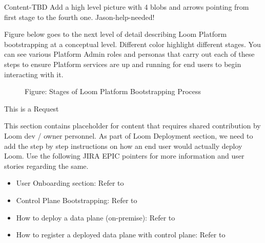 \documentclass[letterpaper,10pt,english]{sphinxmanual}
\begin{document}
\begin{itemize}
\end{itemize}

Content-TBD
Add a high level picture with 4 blobs and arrows pointing from first stage to the fourth one.
Jason-help-needed!

Figure below goes to the next level of detail describing Loom Platform bootstrapping at a conceptual level.  Different color highlight different stages.  You can see various Platform Admin roles and personas that carry out each of these steps to ensure Platform services are up and running for end users to begin interacting with it.

\begin{figure}[htbp]
\centering
\capstart

\noindent{}
\caption{Figure: Stages of Loom Platform Bootstrapping Process}\label{\detokenize{loom_installation_guide:id2}}\end{figure}




This is a  Request

This section contains placeholder for content that requires shared contribution by Loom dev / owner personnel. As part of Loom Deployment section, we need to add the step by step instructions on how an end user would actually deploy Loom.  Use the following JIRA EPIC pointers for more information and user stories regarding the same.
\begin{itemize}
\item {} 
User Onboarding section: Refer to 

\item {} 
Control Plane Bootstrapping: Refer to 

\item {} 
How to deploy a data plane (on-premise): Refer to 

\item {} 
How to register a deployed data plane with control plane: Refer to 

\end{itemize}
\end{document}
